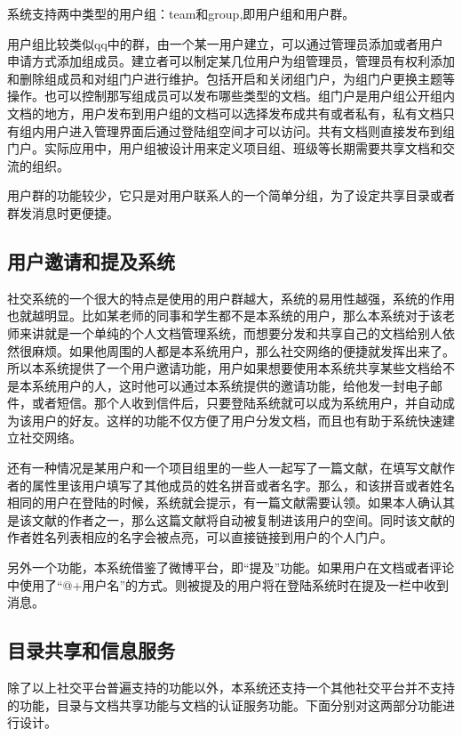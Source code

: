 系统支持两中类型的用户组：team和group,即用户组和用户群。

用户组比较类似qq中的群，由一个某一用户建立，可以通过管理员添加或者用户申请方式添加组成员。建立者可以制定某几位用户为组管理员，管理员有权利添加和删除组成员和对组门户进行维护。包括开启和关闭组门户，为组门户更换主题等操作。也可以控制那写组成员可以发布哪些类型的文档。组门户是用户组公开组内文档的地方，用户发布到用户组的文档可以选择发布成共有或者私有，私有文档只有组内用户进入管理界面后通过登陆组空间才可以访问。共有文档则直接发布到组门户。实际应用中，用户组被设计用来定义项目组、班级等长期需要共享文档和交流的组织。

用户群的功能较少，它只是对用户联系人的一个简单分组，为了设定共享目录或者群发消息时更便捷。

\subsection{用户邀请和提及系统}
\label{sec:ins}

社交系统的一个很大的特点是使用的用户群越大，系统的易用性越强，系统的作用也就越明显。比如某老师的同事和学生都不是本系统的用户，那么本系统对于该老师来讲就是一个单纯的个人文档管理系统，而想要分发和共享自己的文档给别人依然很麻烦。如果他周围的人都是本系统用户，那么社交网络的便捷就发挥出来了。所以本系统提供了一个用户邀请功能，用户如果想要使用本系统共享某些文档给不是本系统用户的人，这时他可以通过本系统提供的邀请功能，给他发一封电子邮件，或者短信。那个人收到信件后，只要登陆系统就可以成为系统用户，并自动成为该用户的好友。这样的功能不仅方便了用户分发文档，而且也有助于系统快速建立社交网络。

还有一种情况是某用户和一个项目组里的一些人一起写了一篇文献，在填写文献作者的属性里该用户填写了其他成员的姓名拼音或者名字。那么，和该拼音或者姓名相同的用户在登陆的时候，系统就会提示，有一篇文献需要认领。如果本人确认其是该文献的作者之一，那么这篇文献将自动被复制进该用户的空间。同时该文献的作者姓名列表相应的名字会被点亮，可以直接链接到用户的个人门户。

另外一个功能，本系统借鉴了微博平台，即“提及”功能。如果用户在文档或者评论中使用了“@+用户名”的方式。则被提及的用户将在登陆系统时在提及一栏中收到消息。

\subsection{目录共享和信息服务}
\label{sec:informationservice}

除了以上社交平台普遍支持的功能以外，本系统还支持一个其他社交平台并不支持的功能，目录与文档共享功能与文档的认证服务功能。下面分别对这两部分功能进行设计。

